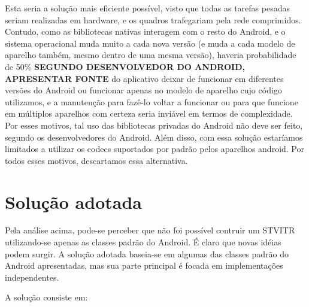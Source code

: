 \documentclass{acm_proc_article-sp}
\newcommand{\todo}[1]{\textcolor[rgb]{1.00,0.00,0.00}{\bf \uppercase{#1}}}
\begin{document}
Esta seria a solução mais eficiente possível, visto que todas as tarefas pesadas seriam realizadas em hardware, e os quadros trafegariam pela rede comprimidos. Contudo, como as bibliotecas nativas interagem com o resto do Android, e o sistema operacional muda muito a cada nova versão (e muda a cada modelo de aparelho também, mesmo dentro de uma mesma versão), haveria probabilidade de 50\% \todo{segundo desenvolvedor do android, apresentar fonte} do aplicativo deixar de funcionar em diferentes versões do Android ou funcionar apenas no modelo de aparelho cujo código utilizamos, e a manutenção para fazê-lo voltar a funcionar ou para que funcione em múltiplos aparelhos com certeza seria inviável em termos de complexidade. Por esses motivos, tal uso das bibliotecas privadas do Android não deve ser feito, segundo os desenvolvedores do Android. Além disso, com essa solução estaríamos limitados a utilizar os codecs suportados por padrão pelos aparelhos android. Por todos esses motivos, descartamos essa alternativa.

\section{Solução adotada}

Pela análise acima, pode-se perceber que não foi possível contruir um STVITR utilizando-se apenas as classes padrão do Android. É claro que novas idéias podem surgir. A solução adotada baseia-se em algumas das classes padrão do Android apresentadas, mas sua parte principal é focada em implementações independentes.

A solução consiste em:
\end{document}
